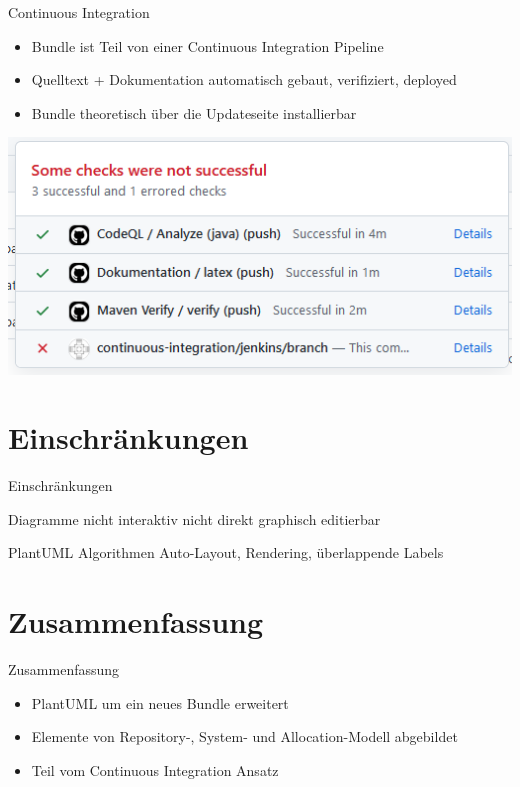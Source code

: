 \documentclass{sdqbeamer}
\begin{document}
\begin{frame}{Continuous Integration}
\begin{itemize}
    \item Bundle ist Teil von einer Continuous Integration Pipeline
    \item Quelltext + Dokumentation automatisch gebaut, verifiziert, deployed
    \item Bundle theoretisch über die Updateseite installierbar
\end{itemize}
\centering
\includegraphics[width=.6\textwidth,height=.5\textheight]{github.png}

\end{frame}

\section{Einschränkungen}
\begin{frame}{Einschränkungen}
\begin{redblock}{Diagramme nicht interaktiv}
nicht direkt graphisch editierbar \texttt{}
\end{redblock}
\pause
\begin{redblock}{PlantUML Algorithmen}
Auto-Layout, Rendering, überlappende Labels \texttt{}
\end{redblock}
\end{frame}

\section{Zusammenfassung}
\begin{frame}{Zusammenfassung}
    \begin{itemize}
        \item PlantUML um ein neues Bundle erweitert
        \item Elemente von Repository-, System- und Allocation-Modell abgebildet
        \item Teil vom Continuous Integration Ansatz 
    \end{itemize}
\end{frame}
\end{document}
